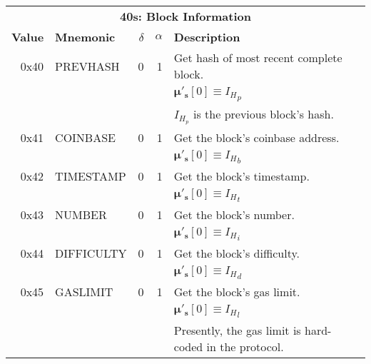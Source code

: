 \documentclass[9pt,oneside]{amsart}
\begin{document}
\begin{tabular*}{\columnwidth}[h]{rlrrl}
\toprule
\multicolumn{5}{c}{\textbf{40s: Block Information}} \vspace{5pt} \\
\textbf{Value} & \textbf{Mnemonic} & $\delta$ & $\alpha$ & \textbf{Description} \vspace{5pt} \\
0x40 & {\small PREVHASH} & 0 & 1 & Get hash of most recent complete block. \\
&&&& $\boldsymbol{\mu}'_\mathbf{s}[0] \equiv {I_H}_p$ \\
&&&& $I_{H_p}$ is the previous block's hash. \\
\midrule
0x41 & {\small COINBASE} & 0 & 1 & Get the block's coinbase address. \\
&&&& $\boldsymbol{\mu}'_\mathbf{s}[0] \equiv {I_H}_b$ \\
\midrule
0x42 & {\small TIMESTAMP} & 0 & 1 & Get the block's timestamp. \\
&&&& $\boldsymbol{\mu}'_\mathbf{s}[0] \equiv {I_H}_t$ \\
\midrule
0x43 & {\small NUMBER} & 0 & 1 & Get the block's number. \\
&&&& $\boldsymbol{\mu}'_\mathbf{s}[0] \equiv {I_H}_i$ \\
\midrule
0x44 & {\small DIFFICULTY} & 0 & 1 & Get the block's difficulty. \\
&&&& $\boldsymbol{\mu}'_\mathbf{s}[0] \equiv {I_H}_d$ \\
\midrule
0x45 & {\small GASLIMIT} & 0 & 1 & Get the block's gas limit. \\
&&&& $\boldsymbol{\mu}'_\mathbf{s}[0] \equiv {I_H}_l$ \\
&&&& Presently, the gas limit is hard-coded in the protocol. \\
\bottomrule
\end{tabular*}
\end{document}
